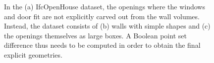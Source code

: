 \begin{figure}[tbp]
\enspace%
\enspace%
\caption[Openings in the IfcOpenHouse dataset]{In the (a) IfcOpenHouse dataset\protect\footnotemark, the openings where the windows and door fit are not explicitly carved out from the wall volumes.
Instead, the dataset consists of (b) walls with simple shapes and (c) the openings themselves as large boxes.
A Boolean point set difference thus needs to be computed in order to obtain the final explicit geometries.}
\label{fig:ioh-diff}
\end{figure}


